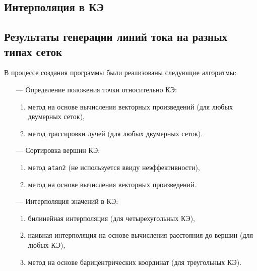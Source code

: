 \subsection{Интерполяция в КЭ}


\subsection{Результаты генерации линий тока на разных типах сеток}
В процессе создания программы были реализованы следующие алгоритмы:
\begin{itemize}
	\item[---] Определение положения точки относительно КЭ:
	\begin{enumerate}[label=\arabic*)]
		\item метод на основе вычисления векторных произведений (для любых двумерных сеток),
		\item метод трассировки лучей (для любых двумерных сеток).
	\end{enumerate}
	\item[---] Сортировка вершин КЭ:
	\begin{enumerate}[label=\arabic*)]
		\item метод \verb|atan2| (не используется ввиду неэффективности),
		\item метод на основе вычисления векторных произведений.
	\end{enumerate}
	\item[---] Интерполяция значений в КЭ:
	\begin{enumerate}[label=\arabic*)]
		\item билинейная интерполяция (для четырехугольных КЭ),
		\item наивная интерполяция на основе вычисления расстояния до вершин (для любых КЭ),
		\item метод на основе барицентрических координат (для треугольных КЭ).
	\end{enumerate}
\end{itemize}

